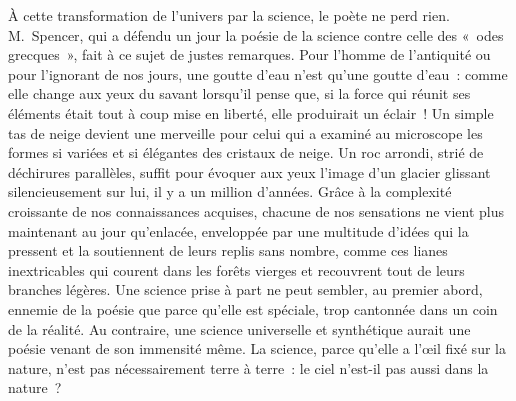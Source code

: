 \documentclass[french,twoside]{book} %
\begin{document}
\noindent À cette transformation de l’univers par la science, le poète ne perd rien. M. Spencer, qui a défendu un jour la poésie de la science contre celle des « odes grecques », fait à ce sujet de justes remarques. Pour l’homme de l’antiquité ou pour l’ignorant de nos jours, une goutte d’eau n’est qu’une goutte d’eau : comme elle change aux yeux du savant lorsqu’il pense que, si la force qui réunit ses éléments était tout à coup mise en liberté, elle produirait un éclair ! Un simple tas de neige devient une merveille pour celui qui a examiné au microscope les formes si variées et  si élégantes des cristaux de neige. Un roc arrondi, strié de déchirures parallèles, suffit pour évoquer aux yeux l’image d’un glacier glissant silencieusement sur lui, il y a un million d’années. Grâce à la complexité croissante de nos connaissances acquises, chacune de nos sensations ne vient plus maintenant au jour qu’enlacée, enveloppée par une multitude d’idées qui la pressent et la soutiennent de leurs replis sans nombre, comme ces lianes inextricables qui courent dans les forêts vierges et recouvrent tout de leurs branches légères. Une science prise à part ne peut sembler, au premier abord, ennemie de la poésie que parce qu’elle est spéciale, trop cantonnée dans un coin de la réalité. Au contraire, une science universelle et synthétique aurait une poésie venant de son immensité même. La science, parce qu’elle a l’œil fixé sur la nature, n’est pas nécessairement terre à terre : le ciel n’est-il pas aussi dans la nature ?\par
\end{document}
